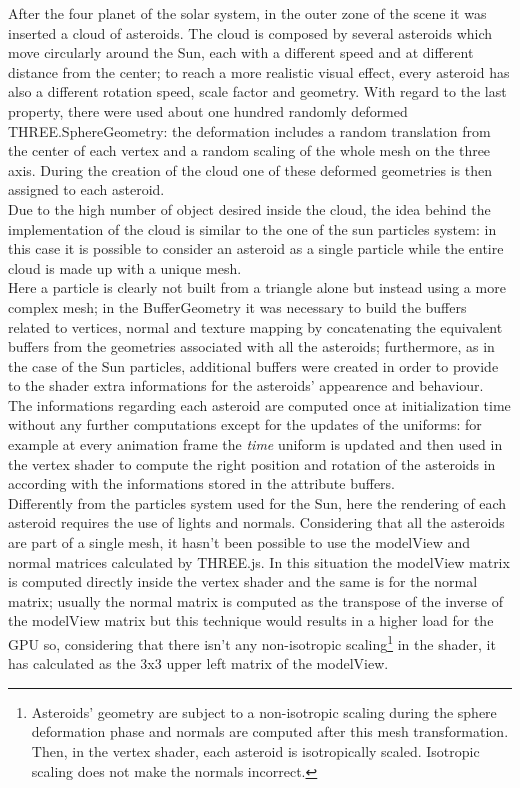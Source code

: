 \documentclass[paper=a4, fontsize=11pt]{scrartcl} %
\numberwithin{equation}{section} %
\numberwithin{figure}{section} %
\numberwithin{table}{section} %
\theoremstyle{definition}
\begin{document}
After the four planet of the solar system, in the outer zone of the scene it was inserted a cloud of asteroids. The cloud is composed by several asteroids which move circularly around the Sun, each with a different speed and at different distance from the center; to reach a more realistic visual effect, every asteroid has also a different rotation speed, scale factor and geometry. With regard to the last property, there were used about one hundred randomly deformed THREE.SphereGeometry: the deformation includes a random translation from the center of each vertex and a random scaling of the whole mesh on the three axis. During the creation of the cloud one of these deformed geometries is then assigned to each asteroid.\\
Due to the high number of object desired inside the cloud, the idea behind the implementation of the cloud is similar to the one of the sun particles system: in this case it is possible to consider an asteroid as a single particle while the entire cloud is made up with a unique mesh.\\
Here a particle is clearly not built from a triangle alone but instead using a more complex mesh; in the BufferGeometry it was necessary to build the buffers related to vertices, normal and texture mapping by concatenating the equivalent buffers from the geometries associated with all the asteroids; furthermore, as in the case of the Sun particles, additional buffers were created in order to provide to the shader extra informations for the asteroids' appearence and behaviour.\\
The informations regarding each asteroid are computed once at initialization time without any further computations except for the updates of the uniforms: for example at every animation frame the \textit{time} uniform is updated and then used in the vertex shader to compute the right position and rotation of the asteroids in according with the informations stored in the attribute buffers.\\
Differently from the particles system used for the Sun, here the rendering of each asteroid requires the use of lights and normals. Considering that all the asteroids are part of a single mesh, it hasn't been possible to use the modelView and normal matrices calculated by THREE.js. In this situation the modelView matrix is computed directly inside the vertex shader and the same is for the normal matrix; usually the normal matrix is computed as the transpose of the inverse of the modelView matrix but this technique would results in a higher load for the GPU so, considering that there isn't any non-isotropic scaling\footnote{Asteroids' geometry are subject to a non-isotropic scaling during the sphere deformation phase and normals are computed after this mesh transformation. Then, in the vertex shader, each asteroid is isotropically scaled. Isotropic scaling does not make the normals incorrect.} in the shader, it has calculated as the 3x3 upper left matrix of the modelView.\\
\end{document}

